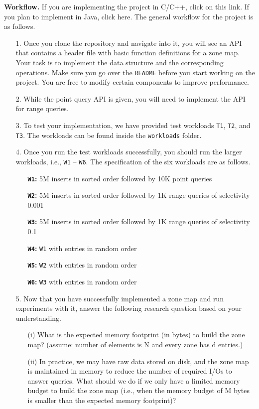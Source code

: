 \documentclass[12pt,a4paper,twoside]{article}
\begin{document}
\noindent \textbf{Workflow.} If you are implementing the project in C/C++, click on this link. 
If you plan to implement in Java, click here. 
The general workflow for the project is as follows.

\begin{enumerate}
    \item[1.] Once you clone the repository and navigate into it, you will see an API that contains a header file with basic function definitions for a zone map. Your task is to implement the data structure and the corresponding operations. 
    Make sure you go over the \texttt{README} before you start working on the project. 
    You are free to modify certain components to improve performance. 
    \item[2.] While the point query API is given, you will need to implement the API for range queries. 
    \item[3.] To test your implementation, we have provided test workloads \texttt{T1}, \texttt{T2}, and \texttt{T3}. The workloads can be found inside the \texttt{workloads} folder. 
    \item[4.] Once you run the test workloads successfully, you should run the larger workloads, i.e., \texttt{W1} -- \texttt{W6}. 
    The specification of the six workloads are as follows. 
    \begin{enumerate}
        \item[\textbf{\texttt{W1}:}] 5M inserts in sorted order followed by 10K point queries 
        \item[\textbf{\texttt{W2}:}] 5M inserts in sorted order followed by 1K range queries of selectivity 0.001
        \item[\textbf{\texttt{W3}:}] 5M inserts in sorted order followed by 1K range queries of selectivity 0.1
        \item[\textbf{\texttt{W4}:}] \texttt{W1} with entries in random order
        \item[\textbf{\texttt{W5}:}] \texttt{W2} with entries in random order
        \item[\textbf{\texttt{W6}:}] \texttt{W3} with entries in random order
    \end{enumerate}
    \item[5.] Now that you have successfully implemented a zone map and run experiments with it, answer the following research question based on your understanding. \begin{enumerate}
        \item[(i)] What is the expected memory footprint (in bytes) to build the zone map? (assume: number of elements is N and every zone has d entries.) 
        \item[(ii)] In practice, we may have raw data stored on disk, and the zone map is maintained in memory to reduce the number of required I/Os to answer queries. What should we do if we only have a limited memory budget to build the zone map (i.e., when the memory budget of M bytes is smaller than the expected memory footprint)? 
    \end{enumerate}
\end{enumerate}
\end{document}
